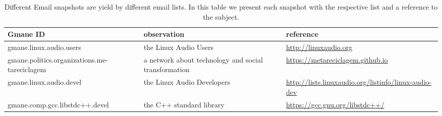 \begin{apendicesenv}
																																      \begin{table*}[h!]\scriptsize
																																	      \begin{center}
																																		      \caption{Different Email snapshots are yield by different email lists. In this
																																		      table we present each snapshot with the respective list and a
																																		      reference to the subject.}\label{tab:provenance}
																																		      \begin{tabular}{| p{4cm} || p{4cm} | p{4cm} | }\hline
																																			      \textbf{Gmane ID} & \textbf{observation} & \textbf{reference} \\\hline\hline
																																				      gmane.linux.audio.users & the Linux Audio Users & \url{http://linuxaudio.org} \\\hline
																																					  gmane.politics.organizations.me-tareciclagem & a network about technology and social transformation  & \url{https://metareciclagem.github.io} \\\hline
																																					      gmane.linux.audio.devel & the Linux Audio Developers & \url{http://lists.linuxaudio.org/listinfo/linux-audio-dev} \\\hline
																																						  gmane.comp.gcc.libstdc++.devel & the C++ standard library & \url{https://gcc.gnu.org/libstdc++/} \\\hline
																																		      \end{tabular}\end{center}
																																	      \end{table*}                    


\end{apendicesenv}
